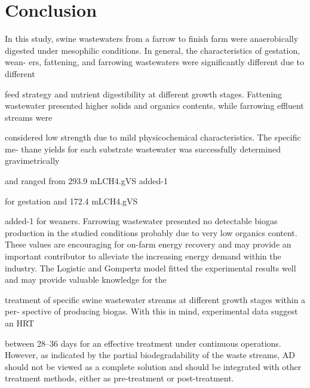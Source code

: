 \section{Conclusion}
In this study, swine wastewaters from a farrow to finish farm were anaerobically
digested under mesophilic conditions. In general, the characteristics of gestation, wean-
ers, fattening, and farrowing wastewaters were significantly different due to different

feed strategy and nutrient digestibility at different growth stages. Fattening wastewater
presented higher solids and organics contents, while farrowing effluent streams were

considered low strength due to mild physicochemical characteristics. The specific me-
thane yields for each substrate wastewater was successfully determined gravimetrically

and ranged from 293.9 mLCH4.gVS added-1

for gestation and 172.4 mLCH4.gVS

added-1
for weaners. Farrowing wastewater presented no detectable biogas production
in the studied conditions probably due to very low organics content. These values are
encouraging for on-farm energy recovery and may provide an important contributor to
alleviate the increasing energy demand within the industry. The Logistic and Gompertz
model fitted the experimental results well and may provide valuable knowledge for the

treatment of specific swine wastewater streams at different growth stages within a per-
spective of producing biogas. With this in mind, experimental data suggest an HRT

between 28–36 days for an effective treatment under continuous operations. However,
as indicated by the partial biodegradability of the waste streams, AD should not be
viewed as a complete solution and should be integrated with other treatment methods,
either as pre-treatment or post-treatment.